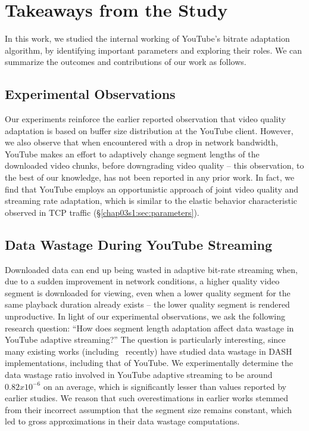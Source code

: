 \section{Takeaways from the Study}
\label{chap03s1:sec:conclusion}

In this work, we studied the internal working of YouTube's bitrate adaptation algorithm, by identifying important parameters and exploring their roles.
We can summarize the outcomes and contributions of our work as follows.

\subsection{Experimental Observations} Our experiments reinforce the earlier reported observation that video quality adaptation is based on buffer size distribution at the YouTube client.
However, we also observe that when encountered with a drop in network bandwidth, YouTube makes an effort to adaptively change segment lengths of the downloaded video chunks, before downgrading video quality -- this observation, to the best of our knowledge, has not been reported in any prior work.
In fact, we find that YouTube employs an opportunistic approach of joint video quality and streaming rate adaptation, which is similar to the elastic behavior characteristic  observed in TCP traffic (\S\ref{chap03s1:sec:parameters}).

\subsection{Data Wastage During YouTube Streaming} Downloaded data can end up being wasted in adaptive bit-rate streaming when, due to a sudden improvement in network conditions, a higher quality video segment is downloaded for viewing, even when a lower quality segment for the same playback duration already exists -- the lower quality segment is rendered unproductive.
In light of our experimental observations, we ask the following research question: ``How does segment length adaptation affect data wastage in YouTube adaptive streaming?''
The question is particularly interesting, since many existing works (including~\cite{sieber2016sacrificing} recently) have studied data wastage in DASH implementations, including that of YouTube.
We experimentally determine the data wastage ratio involved in YouTube adaptive streaming to be around $0.82x10^{-6}$ on an average, which is significantly lesser than values reported by earlier studies.%
We reason that such overestimations in earlier works stemmed from their incorrect assumption that the segment size remains constant, which led to gross approximations in their data wastage computations.

